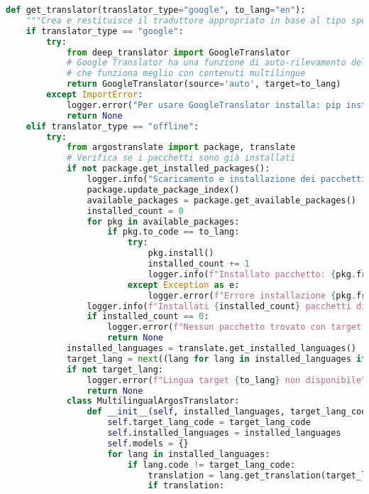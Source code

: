 \documentclass[a4paper,12pt]{article}
\begin{document}
\begin{lstlisting}[language=Python, caption=Versione 1.0 del traduttore]
def get_translator(translator_type="google", to_lang="en"):
    """Crea e restituisce il traduttore appropriato in base al tipo specificato"""
    if translator_type == "google":
        try:
            from deep_translator import GoogleTranslator
            # Google Translator ha una funzione di auto-rilevamento della lingua
            # che funziona meglio con contenuti multilingue
            return GoogleTranslator(source='auto', target=to_lang)
        except ImportError:
            logger.error("Per usare GoogleTranslator installa: pip install deep-translator")
            return None
    elif translator_type == "offline":
        try:
            from argostranslate import package, translate
            # Verifica se i pacchetti sono già installati
            if not package.get_installed_packages():
                logger.info("Scaricamento e installazione dei pacchetti di traduzione...")
                package.update_package_index()
                available_packages = package.get_available_packages()
                installed_count = 0
                for pkg in available_packages:
                    if pkg.to_code == to_lang:
                        try:
                            pkg.install()
                            installed_count += 1
                            logger.info(f"Installato pacchetto: {pkg.from_code} -> {pkg.to_code}")
                        except Exception as e:
                            logger.error(f"Errore installazione {pkg.from_code}: {str(e)}")
                logger.info(f"Installati {installed_count} pacchetti di traduzione verso {to_lang}")
                if installed_count == 0:
                    logger.error(f"Nessun pacchetto trovato con target {to_lang}")
                    return None
            installed_languages = translate.get_installed_languages()
            target_lang = next((lang for lang in installed_languages if lang.code == to_lang), None)
            if not target_lang:
                logger.error(f"Lingua target {to_lang} non disponibile")
                return None
            class MultilingualArgosTranslator:
                def __init__(self, installed_languages, target_lang_code):
                    self.target_lang_code = target_lang_code
                    self.installed_languages = installed_languages
                    self.models = {}
                    for lang in installed_languages:
                        if lang.code != target_lang_code:
                            translation = lang.get_translation(target_lang_code)
                            if translation:

\end{lstlisting}
\end{document}
